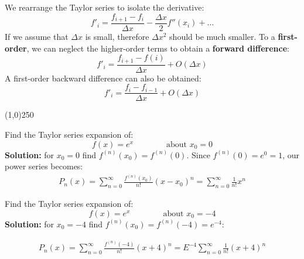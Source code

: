 We rearrange the Taylor series to isolate the derivative:
\begin{equation*}
f'_{i}=\frac{f_{i+1}-f_{i}}{\Delta x} - \frac{\Delta x}{2} f''(x_{i})+\hdots
\end{equation*}
If we assume that $\Delta x$ is small, therefore $\Delta x^{2}$ should be much smaller. To a \textbf{first-order}, we can neglect the higher-order terms to obtain a \textbf{forward difference}:
\begin{equation*}
f'_{i}=\frac{f_{i+1}-f(i)}{\Delta x} +O(\Delta x)
\end{equation*}
A first-order backward difference can also be obtained:
\begin{equation*}
f'_{i}=\frac{f_{i}-f_{i-1}}{\Delta x} +O(\Delta x)
\end{equation*}
\begin{center}
\line(1,0){250}
\end{center}


\begin{exmp}{}
Find the Taylor series expansion of:
\begin{equation*}
f(x)=e^x \qquad \qquad \text{about }x_0=0
\end{equation*}
\textbf{Solution:} for $x_0=0$ find $f^{(n)}(x_0)=f^{(n)}(0)$. Since $f^{(n)}(0)=e^0=1$, our power series becomes:
\begin{align*}
P_n(x)=\sum^\infty_{n=0}\frac{f^{(n)}(x_0)}{n!}(x-x_0)^n=\sum^\infty_{n=0}\frac{1}{n!}x^n
\end{align*}
\end{exmp}


\begin{exmp}{}
Find the Taylor series expansion of:
\begin{equation}
f(x)=e^x \qquad \qquad \text{about }x_0=-4
\end{equation}
\textbf{Solution:} for $x_0=-4$ find $f^{(n)}(x_0)=f^{(n)}(-4)=e^{-4}$:

\begin{align*}
P_n(x)=\sum^\infty_{n=0}\frac{f^{(n)}(-4)}{n!}(x+4)^n=E^{-4}\sum^\infty_{n=0}\frac{1}{n!}(x+4)^n
\end{align*}
\end{exmp}




